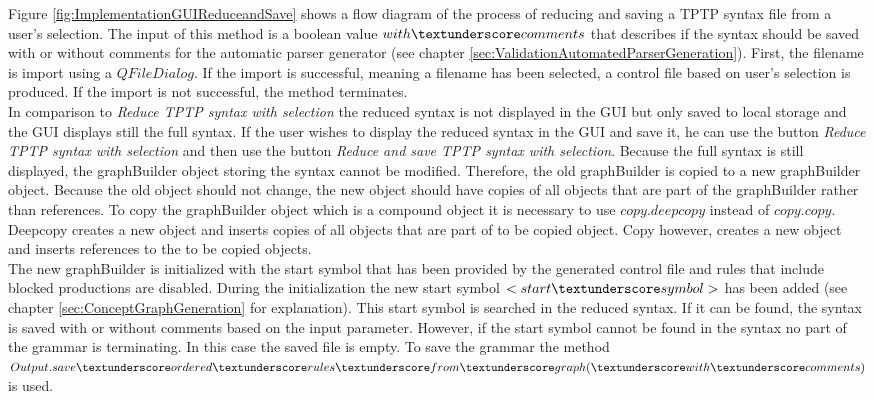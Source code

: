 Figure \ref{fig:ImplementationGUIReduceandSave} shows a flow diagram of the process of reducing and saving a \ac{TPTP} syntax file from a user's selection.
The input of this method is a boolean value $with\textunderscore comments$ that describes if the syntax should be saved with or without comments for the automatic parser generator (see chapter \ref{sec:ValidationAutomatedParserGeneration}). 
First, the filename is import using a $QFileDialog$.
If the import is successful, meaning a filename has been selected, a control file based on user's selection is produced. If the import is not successful, the method terminates. \\
In comparison to \textit{Reduce \ac{TPTP} syntax with selection} the reduced syntax is not displayed in the GUI but only saved to local storage and the GUI displays still the full syntax. If the user wishes to display the reduced syntax in the GUI and save it, he can use the button \textit{Reduce \ac{TPTP} syntax with selection} and then use the button \textit{Reduce and save \ac{TPTP} syntax with selection}.
Because the full syntax is still displayed, the graphBuilder object storing the syntax cannot be modified. Therefore, the old graphBuilder is copied to a new graphBuilder object. Because the old object should not change, the new object should have copies of all objects that are part of the graphBuilder rather than references.
To copy the graphBuilder object which is a compound object it is necessary to use $copy.deepcopy$ instead of $copy.copy$. Deepcopy creates a new object and inserts copies of all objects that are part of to be copied object. Copy however, creates a new object and inserts references to the to be copied objects.\\
The new graphBuilder is initialized with the start symbol that has been provided by the generated control file and rules that include blocked productions are disabled. During the initialization the new start symbol $<start\textunderscore symbol>$ has been added (see chapter \ref{sec:ConceptGraphGeneration} for explanation).
This start symbol is searched in the reduced syntax.
If it can be found, the syntax is saved with or without comments based on the input parameter.
However, if the start symbol cannot be found in the syntax no part of the grammar is terminating.
In this case the saved file is empty.
To save the grammar the method $Output.save\textunderscore ordered\textunderscore rules\textunderscore from\textunderscore graph(\textunderscore with\textunderscore comments)$ is used.

